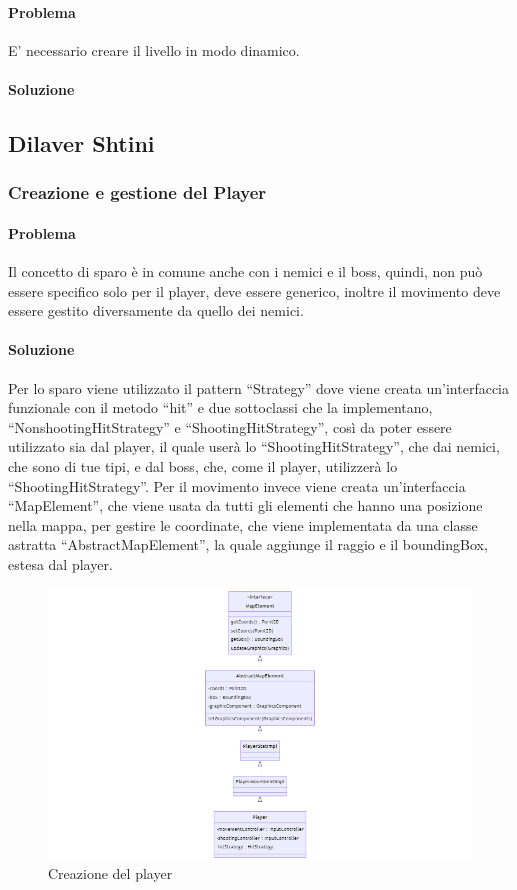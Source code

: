 \documentclass[a4paper,12pt]{report}
\begin{document}
\paragraph{Problema} E' necessario creare il livello in modo dinamico.

\paragraph{Soluzione}



\subsection*{Dilaver Shtini}
\subsubsection{Creazione e gestione del Player}
\paragraph{Problema}
Il concetto di sparo è in comune anche con i nemici e il boss, quindi, non può essere specifico solo per il player, deve essere generico, inoltre il movimento deve essere gestito diversamente da quello dei nemici.
\paragraph{Soluzione}
Per lo sparo viene utilizzato il pattern “Strategy” dove viene creata un’interfaccia funzionale con il metodo “hit” e due sottoclassi che la implementano, “NonshootingHitStrategy” e “ShootingHitStrategy”, così da poter essere utilizzato sia dal player, il quale userà lo “ShootingHitStrategy”, che dai nemici, che sono di tue tipi, e dal boss, che, come il player, utilizzerà lo “ShootingHitStrategy”.                          Per il movimento invece viene creata un’interfaccia “MapElement”, che viene usata da tutti gli elementi che hanno una posizione nella mappa, per gestire le coordinate, che viene implementata da una classe astratta “AbstractMapElement”, la quale aggiunge il raggio e il boundingBox, estesa dal player.

\newpage
\begin{figure}
\centering{}
\includegraphics[scale=0.5]{diagram/player.png}
\caption{Creazione del player}
\label{player}
\end{figure}
\end{document}
